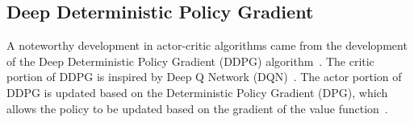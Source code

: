 
\subsection{Deep Deterministic Policy Gradient}
A noteworthy development in actor-critic algorithms came from the development of the Deep Deterministic Policy Gradient (DDPG) algorithm~\cite{Lillicrap:2016a}.
The critic portion of DDPG is inspired by Deep Q Network (DQN)~\cite{Mnih:2013a,Mnih:2015a}. The actor portion of DDPG is updated based on the Deterministic Policy Gradient (DPG), which allows the policy to be updated based on the gradient of the value function~\cite{Silver:2014a}.



